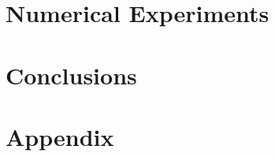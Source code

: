 \documentclass[twocolumn]{IEEEtran}
\begin{document}
\section{Numerical Experiments}





\section{Conclusions}

\section*{Appendix}



\end{document}
